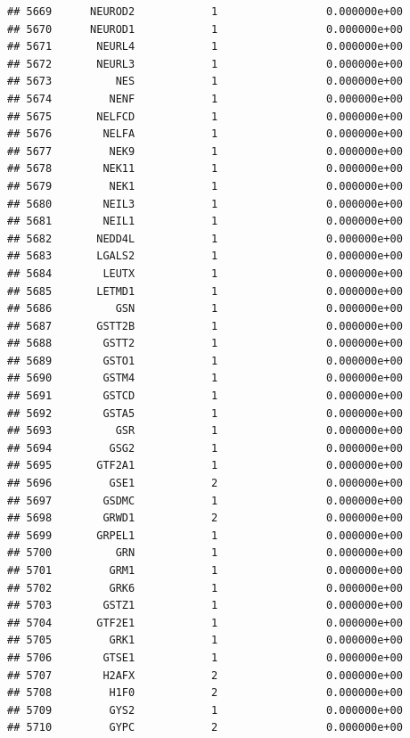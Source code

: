 \documentclass[
]{article}
\begin{document}
\begin{verbatim}
## 5669      NEUROD2            1                 0.000000e+00
## 5670      NEUROD1            1                 0.000000e+00
## 5671       NEURL4            1                 0.000000e+00
## 5672       NEURL3            1                 0.000000e+00
## 5673          NES            1                 0.000000e+00
## 5674         NENF            1                 0.000000e+00
## 5675       NELFCD            1                 0.000000e+00
## 5676        NELFA            1                 0.000000e+00
## 5677         NEK9            1                 0.000000e+00
## 5678        NEK11            1                 0.000000e+00
## 5679         NEK1            1                 0.000000e+00
## 5680        NEIL3            1                 0.000000e+00
## 5681        NEIL1            1                 0.000000e+00
## 5682       NEDD4L            1                 0.000000e+00
## 5683       LGALS2            1                 0.000000e+00
## 5684        LEUTX            1                 0.000000e+00
## 5685       LETMD1            1                 0.000000e+00
## 5686          GSN            1                 0.000000e+00
## 5687       GSTT2B            1                 0.000000e+00
## 5688        GSTT2            1                 0.000000e+00
## 5689        GSTO1            1                 0.000000e+00
## 5690        GSTM4            1                 0.000000e+00
## 5691        GSTCD            1                 0.000000e+00
## 5692        GSTA5            1                 0.000000e+00
## 5693          GSR            1                 0.000000e+00
## 5694         GSG2            1                 0.000000e+00
## 5695       GTF2A1            1                 0.000000e+00
## 5696         GSE1            2                 0.000000e+00
## 5697        GSDMC            1                 0.000000e+00
## 5698        GRWD1            2                 0.000000e+00
## 5699       GRPEL1            1                 0.000000e+00
## 5700          GRN            1                 0.000000e+00
## 5701         GRM1            1                 0.000000e+00
## 5702         GRK6            1                 0.000000e+00
## 5703        GSTZ1            1                 0.000000e+00
## 5704       GTF2E1            1                 0.000000e+00
## 5705         GRK1            1                 0.000000e+00
## 5706        GTSE1            1                 0.000000e+00
## 5707        H2AFX            2                 0.000000e+00
## 5708         H1F0            2                 0.000000e+00
## 5709         GYS2            1                 0.000000e+00
## 5710         GYPC            2                 0.000000e+00

\end{verbatim}
\end{document}
